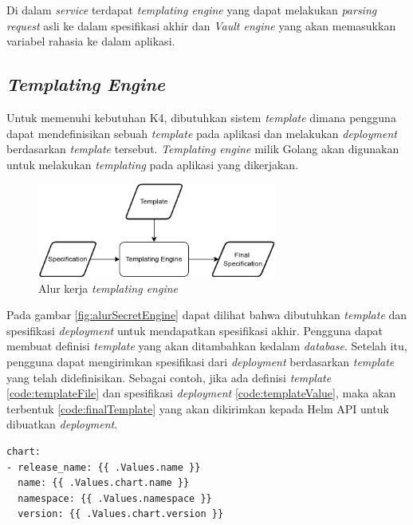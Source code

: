 Di dalam \textit{service} terdapat \textit{templating engine} yang dapat melakukan \textit{parsing request} asli ke dalam spesifikasi akhir dan \textit{Vault engine} yang akan memasukkan variabel rahasia ke dalam aplikasi.

\subsection{\textit{Templating Engine}}
\label{sec:templatingEngine}
Untuk memenuhi kebutuhan K4, dibutuhkan sistem \textit{template} dimana pengguna dapat mendefinisikan sebuah \textit{template} pada aplikasi dan melakukan \textit{deployment} berdasarkan \textit{template} tersebut.\textit{ Templating engine} milik Golang akan digunakan untuk melakukan \textit{templating} pada aplikasi yang dikerjakan. 

\begin{figure}
	\centering
	\includegraphics[width=0.7\textwidth]{pics/TemplatingEngine.png}
	\caption{Alur kerja \textit{templating engine}}
	\label{fig:alurTemplatingEngine}
\end{figure}

Pada gambar \ref{fig:alurSecretEngine} dapat dilihat bahwa dibutuhkan \textit{template} dan spesifikasi \textit{deployment} untuk mendapatkan spesifikasi akhir. Pengguna dapat membuat definisi \textit{template} yang akan ditambahkan kedalam \textit{database}. Setelah itu, pengguna dapat mengirimkan spesifikasi dari \textit{deployment} berdasarkan \textit{template} yang telah didefinisikan. Sebagai contoh, jika ada definisi \textit{template} \ref{code:templateFile} dan spesifikasi \textit{deployment} \ref{code:templateValue}, maka akan terbentuk \ref{code:finalTemplate} yang akan dikirimkan kepada Helm API untuk dibuatkan \textit{deployment}.

\begin{lstlisting}[frame=single,caption={Contoh file \textit{template}},label={code:templateFile}]
chart:
- release_name: {{ .Values.name }}
  name: {{ .Values.chart.name }}
  namespace: {{ .Values.namespace }}
  version: {{ .Values.chart.version }}
\end{lstlisting}

